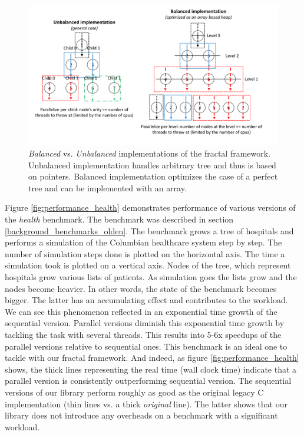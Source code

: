 \begin{figure}[!htb]
\includegraphics[width=1.0\textwidth]{images/balanced_vs_unbalanced.pdf}
\caption{\textit{Balanced} vs. \textit{Unbalanced} implementations of the fractal framework. Unbalanced implementation handles arbitrary tree and thus is based on pointers. Balanced implementation optimizes the case of a perfect tree and can be implemented with an array.}
\label{fig:balanced_vs_unbalanced}
\end{figure}\newline\null
\quad Figure \ref{fig:performance_health} demonstrates performance of various versions of the \textit{health} benchmark. The benchmark was described in section \ref{background_benchmarks_olden}. The benchmark grows a tree of hospitals and performs a simulation of the Columbian healthcare system step by step. The number of simulation steps done is plotted on the horizontal axis. The time a simulation took is plotted on a vertical axis. Nodes of the tree, which represent hospitals grow various lists of patients. As simulation goes the lists grow and the nodes become heavier. In other words, the state of the benchmark becomes bigger. The latter has an accumulating effect and contributes to the workload. We can see this phenomenon reflected in an exponential time growth of the sequential version. Parallel versions diminish this exponential time growth by tackling the task with several threads. This results into 5-6x speedups of the parallel versions relative to sequential ones. This benchmark is an ideal one to tackle with our fractal framework. And indeed, as figure \ref{fig:performance_health} shows, the thick lines representing the real time (wall clock time) indicate that a parallel version is consistently outperforming sequential version. The sequential versions of our library perform roughly as good as the original legacy C implementation (thin lines vs. a thick \textit{original} line). The latter shows that our library does not introduce any overheads on a benchmark with a significant workload.
